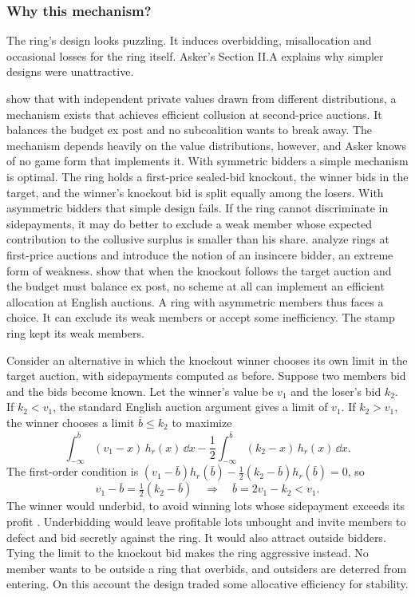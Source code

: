 \subsubsection{Why this mechanism?}

The ring's design looks puzzling. It induces overbidding, misallocation and occasional losses for the ring
itself. Asker's Section II.A explains why simpler designs were unattractive.

\citet{MailathZemsky1991} show that with independent private values drawn from different distributions, a
mechanism exists that achieves efficient collusion at second-price auctions. It balances the budget ex post and
no subcoalition wants to break away. The mechanism depends heavily on the value distributions, however, and
Asker knows of no game form that implements it. With symmetric bidders a simple mechanism is optimal. The ring
holds a first-price sealed-bid knockout, the winner bids in the target, and the winner's knockout bid is split
equally among the losers. With asymmetric bidders that simple design fails. If the ring cannot discriminate in
sidepayments, it may do better to exclude a weak member whose expected contribution to the collusive surplus is
smaller than his share. \citet{McAfeeMcMillan1992} analyze rings at first-price auctions and introduce the
notion of an insincere bidder, an extreme form of weakness. \citet{LopomoMarshallMarx2005} show that when the
knockout follows the target auction and the budget must balance ex post, no scheme at all can implement an
efficient allocation at English auctions. A ring with asymmetric members thus faces a choice. It can exclude its
weak members or accept some inefficiency. The stamp ring kept its weak members.

\begin{remark}\label{rem:13-asker-design}
Consider an alternative in which the knockout winner chooses its own limit in the target auction, with
sidepayments computed as before. Suppose two members bid and the bids become known. Let the winner's value be
$v_1$ and the loser's bid $k_2$. If $k_2<v_1$, the standard English auction argument gives a limit of $v_1$. If
$k_2>v_1$, the winner chooses a limit $\bar b\le k_2$ to maximize
\[
\int_{-\infty}^{\bar b}(v_1-x)\,h_r(x)\,\dd x-\frac{1}{2}\int_{-\infty}^{\bar b}(k_2-x)\,h_r(x)\,\dd x .
\]
The first-order condition is $(v_1-\bar b)h_r(\bar b)-\frac{1}{2}(k_2-\bar b)h_r(\bar b)=0$, so
\[
v_1-\bar b=\tfrac{1}{2}(k_2-\bar b)\quad\Longrightarrow\quad\bar b=2v_1-k_2<v_1 .
\]
The winner would underbid, to avoid winning lots whose sidepayment exceeds its profit \citep[p.~734 and
footnote 19]{Asker2010}. Underbidding would leave profitable lots unbought and invite members to defect and bid
secretly against the ring. It would also attract outside bidders. Tying the limit to the knockout bid makes the
ring aggressive instead. No member wants to be outside a ring that overbids, and outsiders are deterred from
entering. On this account the design traded some allocative efficiency for stability.
\end{remark}

